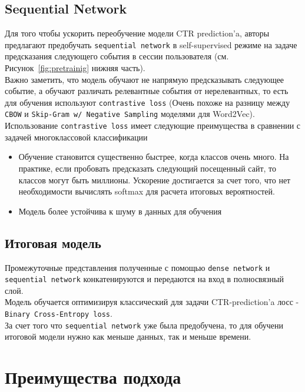 \subsection*{Sequential Network}

Для того чтобы ускорить переобучение модели CTR prediction'a, авторы предлагают предобучать \texttt{sequential network} в self-supervised режиме на задаче предсказания следующего события в сессии пользователя (см. Рисунок~\ref{fig:pretrainig} нижняя часть). \\

Важно заметить, что модель обучают не напрямую предсказывать следующее событие, а обучают различать релевантные события от нерелевантных, то есть для обучения используют \texttt{contrastive loss} (Очень похоже на разницу между \texttt{CBOW} и \texttt{Skip-Gram w/ Negative Sampling} моделями для Word2Vec). \\

Использование \texttt{contrastive loss} имеет следующие преимущества в сравнении с задачей многоклассовой классификации
\begin{itemize}
    \item Обучение становится существенно быстрее, когда классов очень много. На практике, если пробовать предсказать следующий посещенный сайт, то классов могут быть миллионы. Ускорение достигается за счет того, что нет необходимости вычислять softmax для расчета итоговых вероятностей.
    \item Модель более устойчива к шуму в данных для обучения
\end{itemize}

\subsection*{Итоговая модель}

Промежуточные представления полученные с помощью  \texttt{dense network} и \texttt{sequential network} конкатенируются и передаются на вход в полносвязный слой. \\

Модель обучается оптимизируя классический для задачи CTR-prediction'a лосс - \texttt{Binary Cross-Entropy loss}. \\

За счет того что \texttt{sequential network} уже была предобучена, то для обучени итоговой модели нужно как меньше данных, так и меньше времени.

\section*{Преимущества подхода}

